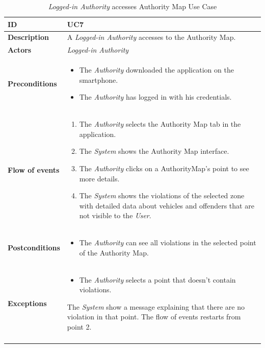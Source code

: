 \documentclass {article}
\begin{document}
	\begin{longtable}{| p{3 cm} | p{10.5 cm} |} 
			\hline
			{\bf ID} & UC7 \\
			\hline
			{\bf Description} & A {\it Logged-in Authority} accesses to the Authority Map.\\
			\hline
			{\bf Actors} & {\it Logged-in Authority}\\
			\hline
			{\bf Preconditions} & 	
			\begin{itemize}
				\item The {\it Authority} downloaded the application on the smartphone.
				\item The {\it Authority} has logged in with his credentials.
			\end{itemize}
			\\
			\hline
			{\bf Flow of events} &	
			\begin{enumerate}
				\item The {\it Authority} selects the Authority Map tab in the application.
				\item The {\it System} shows the Authority Map interface.
				\item The {\it Authority} clicks on a AuthorityMap's point to see more details. 
				\item The {\it System} shows the violations of the selected zone with detailed data about vehicles and offenders that are not visible to the {\it User}. 
			\end{enumerate}
			\\
			\hline
			{\bf Postconditions} & 
			\begin{itemize}
				\item The {\it Authority} can see all violations in the selected point of the Authority Map.
			\end{itemize}
			\\
			\hline
			{\bf Exceptions} & 	
			\begin{itemize}
				\item The {\it Authority} selects a point that doesn't contain violations.
			\end{itemize}
			The {\it System} show a message explaining that there are no violation in that point. The flow of events restarts from point 2. \\
			\hline
			\caption{{\it Logged-in Authority} accesses Authority Map Use Case}
			\end{longtable}
			\pagebreak
			
\end{document}
